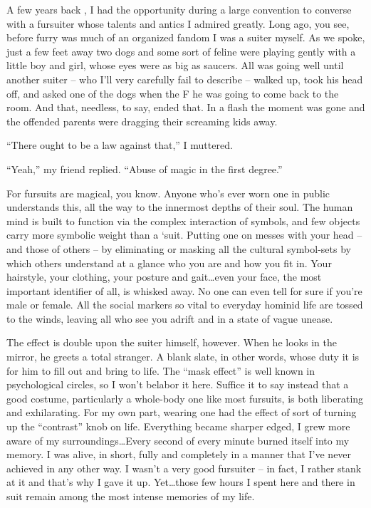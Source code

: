 
A few years back , I had the opportunity during a large convention to converse with a fursuiter whose talents and antics I admired greatly. Long ago, you see, before furry was much of an organized fandom I was a suiter myself. As we spoke, just a few feet away two dogs and some sort of feline were playing gently with a little boy and girl, whose eyes were as big as saucers. All was going well until another suiter -- who I'll very carefully fail to describe -- walked up, took his head off, and asked one of the dogs when the F he was going to come back to the room. And that, needless, to say, ended that. In a flash the moment was gone and the offended parents were dragging their screaming kids away.

``There ought to be a law against that,'' I muttered.

``Yeah,'' my friend replied. ``Abuse of magic in the first degree.''

For fursuits are magical, you know. Anyone who's ever worn one in public understands this, all the way to the innermost depths of their soul. The human mind is built to function via the complex interaction of symbols, and few objects carry more symbolic weight than a ‘suit. Putting one on messes with your head -- and those of others -- by eliminating or masking all the cultural symbol-sets by which others understand at a glance who you are and how you fit in. Your hairstyle, your clothing, your posture and gait\ldots even your face, the most important identifier of all, is whisked away. No one can even tell for sure if you're male or female. All the social markers so vital to everyday hominid life are tossed to the winds, leaving all who see you adrift and in a state of vague unease.

The effect is double upon the suiter himself, however. When he looks in the mirror, he greets a total stranger. A blank slate, in other words, whose duty it is for him to fill out and bring to life. The ``mask effect'' is well known in psychological circles, so I won't belabor it here. Suffice it to say instead that a good costume, particularly a whole-body one like most fursuits, is both liberating and exhilarating. For my own part, wearing one had the effect of sort of turning up the ``contrast'' knob on life. Everything became sharper edged, I grew more aware of my surroundings\ldots Every second of every minute burned itself into my memory. I was alive, in short, fully and completely in a manner that I've never achieved in any other way. I wasn't a very good fursuiter -- in fact, I rather stank at it and that's why I gave it up. Yet\ldots those few hours I spent here and there in suit remain among the most intense memories of my life.

